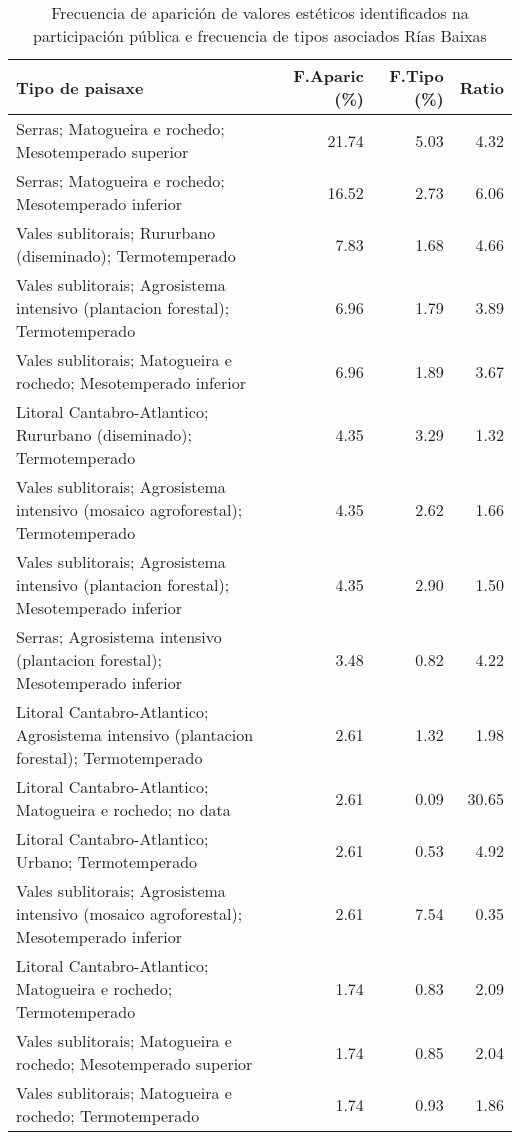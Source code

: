\begin{table}[p]
\centering
\caption{Frecuencia de aparición de valores estéticos identificados na participación pública e frecuencia de tipos asociados Rías Baixas} 
\label{vsixotest12}
\begin{tabular}{lrrr}
  \hline
Tipo de paisaxe & F.Aparic (\%) & F.Tipo (\%) & Ratio \\ 
  \hline
Serras; Matogueira e rochedo; Mesotemperado superior & 21.74 & 5.03 & 4.32 \\ 
  Serras; Matogueira e rochedo; Mesotemperado inferior & 16.52 & 2.73 & 6.06 \\ 
  Vales sublitorais; Rururbano (diseminado); Termotemperado & 7.83 & 1.68 & 4.66 \\ 
  Vales sublitorais; Agrosistema intensivo (plantacion forestal); Termotemperado & 6.96 & 1.79 & 3.89 \\ 
  Vales sublitorais; Matogueira e rochedo; Mesotemperado inferior & 6.96 & 1.89 & 3.67 \\ 
  Litoral Cantabro-Atlantico; Rururbano (diseminado); Termotemperado & 4.35 & 3.29 & 1.32 \\ 
  Vales sublitorais; Agrosistema intensivo (mosaico agroforestal); Termotemperado & 4.35 & 2.62 & 1.66 \\ 
  Vales sublitorais; Agrosistema intensivo (plantacion forestal); Mesotemperado inferior & 4.35 & 2.90 & 1.50 \\ 
  Serras; Agrosistema intensivo (plantacion forestal); Mesotemperado inferior & 3.48 & 0.82 & 4.22 \\ 
  Litoral Cantabro-Atlantico; Agrosistema intensivo (plantacion forestal); Termotemperado & 2.61 & 1.32 & 1.98 \\ 
  Litoral Cantabro-Atlantico; Matogueira e rochedo; no data & 2.61 & 0.09 & 30.65 \\ 
  Litoral Cantabro-Atlantico; Urbano; Termotemperado & 2.61 & 0.53 & 4.92 \\ 
  Vales sublitorais; Agrosistema intensivo (mosaico agroforestal); Mesotemperado inferior & 2.61 & 7.54 & 0.35 \\ 
  Litoral Cantabro-Atlantico; Matogueira e rochedo; Termotemperado & 1.74 & 0.83 & 2.09 \\ 
  Vales sublitorais; Matogueira e rochedo; Mesotemperado superior & 1.74 & 0.85 & 2.04 \\ 
  Vales sublitorais; Matogueira e rochedo; Termotemperado & 1.74 & 0.93 & 1.86 \\ 
   \hline
\end{tabular}
\end{table}
